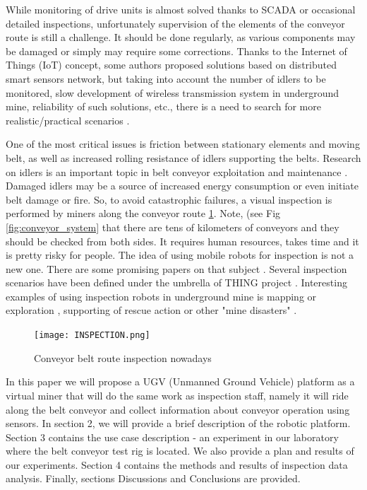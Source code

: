 \documentclass[3p,times,12pt]{elsarticle}
\begin{document}
While monitoring of drive units is almost solved thanks to SCADA or occasional detailed inspections, unfortunately supervision of the elements of the conveyor route is still a challenge. It should be done regularly, as various components may be damaged or simply may require some corrections. Thanks to the Internet of Things (IoT) concept, some authors proposed solutions based on distributed smart sensors network, but taking into account the number of idlers to be monitored, slow development of wireless transmission system in underground mine, reliability of such solutions, etc., there is a need to search for more realistic/practical scenarios \cite{LIU2018277}. 

One of the most critical issues is friction between stationary elements and moving belt, as well as increased rolling resistance of idlers supporting the belts. Research on idlers is an important topic in belt conveyor exploitation and maintenance \cite{krol_diagnostyka, krol_miningscience}. Damaged idlers may be a source of increased energy consumption or even initiate belt damage or fire. So, to avoid catastrophic failures, a visual inspection is performed by miners along the conveyor route \ref{fig:BCS_ispection}. Note, (see Fig \ref{fig:conveyor_system} that there are tens of kilometers of conveyors and they should be checked from both sides. It requires human resources, takes time and it is pretty risky for people. The idea of using mobile robots for inspection is not a new one. There are some promising papers on that subject \cite{8461191,8621649,6462974,932642,1507481}. Several inspection scenarios have been defined under the umbrella of THING project \cite{zimrozMPES2019}. Interesting examples of using inspection robots in underground mine is mapping or exploration \cite{li_savkin_vucetic_2020,8990018,8741532,1371614,Grehl2015,6743612}, supporting of rescue action \cite{5069840,5563599,6685501,5069840} or other "mine disasters" \cite{5420386}.

\begin{figure}[ht!]
	\centering
	\texttt{[image: INSPECTION.png]}
	\caption{Conveyor belt route inspection nowadays}
	\label{fig:BCS_ispection}
\end{figure}

In this paper we will propose a UGV (Unmanned Ground Vehicle) platform as a virtual miner that will do the same work as inspection staff, namely it will ride along the belt conveyor and collect information about conveyor operation using sensors. In section 2, we will provide a brief description of the robotic platform. Section 3 contains the use case description - an experiment in our laboratory where the belt conveyor test rig is located. We also provide a plan and results of our experiments. Section 4 contains the methods and results of inspection data analysis. Finally, sections Discussions and Conclusions are provided.
\end{document}
